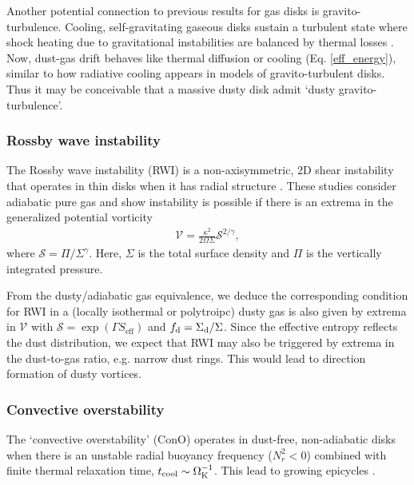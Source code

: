 Another potential connection to previous results for gas disks is  
gravito-turbulence. Cooling, self-gravitating gaseous disks 
sustain a turbulent state where shock heating due to gravitational 
instabilities are balanced by thermal losses
\citep{gammie01}. Now, dust-gas drift behaves like thermal diffusion
or cooling (Eq. \ref{eff_energy}), similar to how radiative cooling 
appears in models of gravito-turbulent disks. Thus it may be
conceivable that a massive dusty disk admit `dusty
gravito-turbulence'. 






\subsubsection{Rossby wave instability}
The Rossby wave instability (RWI) is a non-axisymmetric, 2D shear
instability that operates in thin disks when it has radial structure
\citep{lovelace99,li00}. These studies consider adiabatic pure gas and 
show instability is possible if there is an extrema in the generalized
potential vorticity 
\begin{align}
 \mathcal{V} = \frac{\kappa^2}{2\Omega\Sigma}\mathcal{S}^{2/\gamma},  
\end{align} 
where $\mathcal{S} = \Pi/\Sigma^\gamma$. Here, $\Sigma$ is the total
surface density and $\Pi$ is the vertically integrated pressure. 

From the dusty/adiabatic gas equivalence, we deduce the corresponding
condition for RWI in a (locally isothermal or polytroipc) dusty gas is
also given by extrema in $\mathcal{V}$ with $\mathcal{S} = \exp{\left(\Gamma
S_\mathrm{eff}\right)}$ and $f_\mathrm{d} = \Sigma_\mathrm{d}/\Sigma$. Since
the effective entropy reflects the dust distribution, we expect that
RWI may also be triggered by extrema in the dust-to-gas ratio, e.g. 
narrow dust rings. This would lead to direction formation of dusty
vortices. 



\subsubsection{Convective overstability}
The `convective overstability' (ConO) operates in dust-free, non-adiabatic disks 
when there is an unstable radial buoyancy frequency ($N_r^2 < 0 $)
combined with finite thermal relaxation time, $t_\mathrm{cool}\sim
\Omega_{\rm K}^{-1}$. This lead to growing epicycles
\citep{klahr14,lyra14,latter16}.  

